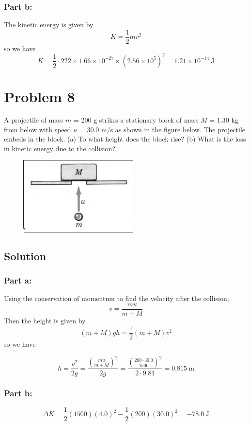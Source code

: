 \documentclass{article}
\begin{document}
\subsubsection*{Part b:}
The kinetic energy is given by
\[
	K = \frac{1}{2}mv^2
\]
so we have
\[
	K = \frac{1}{2} \cdot 222 \times 1.66 \times 10^{-27} \times (2.56 \times 10^5)^2 = \boxed{1.21 \times 10^{-14}\ \text{J}}
\]

\section*{Problem 8}
A projectile of mass $m$ = 200 g strikes a stationary block of mass $M$ = 1.30 kg from below
with speed $u$ = 30.0 m/s as shown in the figure below. The projectile embeds in the block. (a)
To what height does the block rise? (b) What is the loss in kinetic energy due to the collision?

\begin{figure}[ht]
    \centering
    \includegraphics[scale=0.5]{drawing-4.png}
\end{figure}

\subsection*{Solution}
\subsubsection*{Part a:}
Using the conservation of momentum to find the velocity after the collision;
\[
	v = \frac{mu}{m+M}
\]
Then the height is given by
\[
	(m+M)gh = \frac{1}{2}(m+M)v^2
\]
so we have

\[
	h = \frac{v^2}{2g} = \frac{\left( \frac{mu}{m+M} \right)^2}{2g} = \frac{\left( \frac{200 \cdot 30.0}{1500} \right)^2}{2 \cdot 9.81} = \boxed{0.815 \ \text{m}}
\]

\subsubsection*{Part b:}
\[
	\Delta K = \frac{1}{2}(1500)(4.0)^2 - \frac{1}{2}(200)(30.0)^2 = \boxed{-78.0\ \text{J}}
\]
\end{document}
